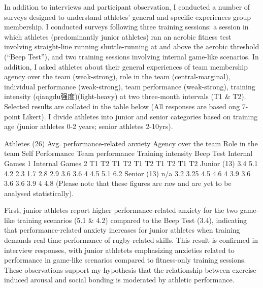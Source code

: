 \documentclass[12pt]{report}
\begin{document}
In addition to interviews and participant observation, I conducted a number of surveys designed to understand athletes’ general and specific experiences group membership.  I conducted surveys following three training sessions: a session in which athletes (predominantly junior athletes) ran an aerobic fitness test involving straight-line running shuttle-running at and above the aerobic threshold (“Beep Test”), and two training sessions involving internal game-like scenarios.   In addition, I asked athletes about their general experiences of team membership agency over the team (weak-strong), role in the team (central-marginal), individual performance (weak-strong), team performance (weak-strong), training intensity (qiangdu强度)(light-heavy) at two three-month intervals (T1 & T2).  Selected results are collated in the table below (All responses are based ong 7-point Likert).  I divide athletes into junior and senior categories based on training age (junior athletes 0-2 years; senior athletes 2-10yrs).








Athletes (26)	Avg. performance-related anxiety	Agency over the team 	Role in the team 	Self Performance	Team performance	Training intensity
	Beep Test	Internal Games 1	Internal Games 2	T1	T2	T1	T2	T1	T2	T1	T2	T1	T2
Junior (13)	3.4	5.1	4.2	2.3	1.7	2.8	2.9	3.6	3.6	4	4.5	5.1	6.2
Senior (13)	n/a	3.2	3.25	4.5	4.6	4	3.9	3.6	3.6	3.6	3.9	4	4.8
(Please note that these figures are raw and are yet to be analysed statistically).

First, junior athletes report higher performance-related anxiety for the two game-like training scenarios (5.1 & 4.2) compared to the Beep Test (3.4), indicating that performance-related anxiety increases for junior athletes when training demands real-time performance of rugby-related skills.  This result is confirmed in interview responses, with junior athletets emphasizing anxieties related to performance in game-like scenarios compared to fitness-only training sessions.  These observations support my hypothesis that the relationship between exercise-induced arousal and social bonding is moderated by athletic performance.
\end{document}
